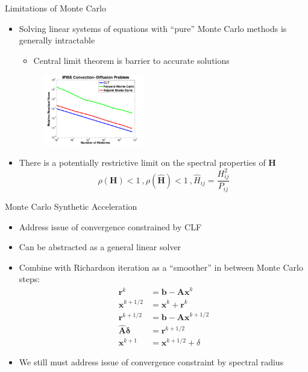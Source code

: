 \documentclass{beamer}
\begin{document}
\begin{frame}{Limitations of Monte Carlo}
  \begin{itemize}
  \item Solving linear systems of equations with ``pure'' Monte Carlo methods
    is generally intractable
    \begin{itemize}
    \item Central limit theorem is barrier to accurate solutions
    \end{itemize}
    \begin{figure}
      \centering
      \includegraphics[width=1.75in]{../NCState_seminar_2014/Ifiss_ConvDiff}
    \end{figure}
  \item There is a potentially restrictive limit on the spectral properties of
    $\mathbf{H}$
    \begin{equation*}
      \rho(\mathbf{H}) < 1\:, \rho(\hat{\mathbf{H}}) < 1\:, \hat{H}_{ij} =
      \frac{H_{ij}^2}{P_{ij}}
    \end{equation*}
  \end{itemize}
\end{frame}


\begin{frame}{Monte Carlo Synthetic Acceleration}
  \begin{itemize}
  \item Address issue of convergence constrained by CLF
    \vfill
  \item Can be abstracted as a general linear solver
    \vfill
  \item Combine with Richardson iteration as a ``smoother'' in between
    Monte Carlo steps:
    \begin{align*}
      \mathbf{r}^k &= \mathbf{b} - \mathbf{Ax}^k \\
      \mathbf{x}^{k+1/2} &= \mathbf{x}^k + \mathbf{r}^k \\
      \mathbf{r}^{k+1/2} &= \mathbf{b} - \mathbf{Ax}^{k+1/2} \\
      \hat{\mathbf{A}} \mathbf{\delta} &= \mathbf{r}^{k+1/2} \\
      \mathbf{x}^{k+1} &= \mathbf{x}^{k+1/2} + \delta
    \end{align*}
  \item We still must address issue of convergence constraint by spectral radius
  \end{itemize}
\end{frame}
\end{document}

